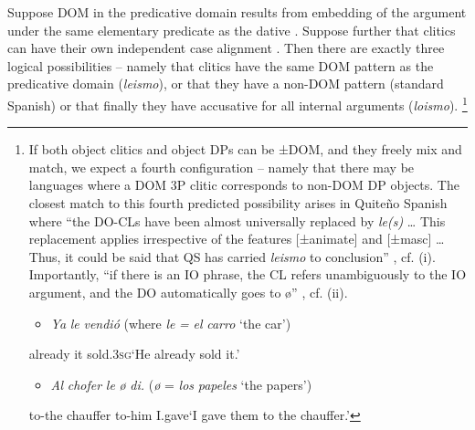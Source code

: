 \documentclass[output=paper,nonflat,modfonts]{langsci/langscibook}
\begin{document}
Suppose DOM in the predicative domain results from embedding of the argument under the same elementary predicate as the dative . Suppose further that clitics can have their own independent case alignment . Then there are exactly three logical possibilities – namely that clitics have the same DOM pattern as the predicative domain (\textit{leismo}), or that they have a non-DOM pattern (standard Spanish) or that finally they have accusative for all internal arguments (\textit{loismo}).\textstyleFootnoteSymbol{} \footnote{If both object clitics and object DPs can be ±DOM, and they freely mix and match, we expect a fourth configuration – namely that there may be languages where a DOM 3P clitic corresponds to non-DOM DP objects. The closest match to this fourth predicted possibility arises in Quiteño Spanish where “the DO-CLs have been almost universally replaced by \textit{le(s)} … This replacement applies irrespective of the features [±animate] and [±masc] …Thus, it could be said that QS has carried \textit{leismo} to conclusion” \citep[387-388]{Suñer1989}, cf. (i). Importantly, “if there is an IO phrase, the CL refers unambiguously to the IO argument, and the DO automatically goes to ø” \citep[389]{Suñer1989}, cf. (ii).  

\begin{itemize}
\item \begin{styleListParagraph}
\textit{Ya} \textit{le}   \textit{vendió}      (where \textit{le} \textit{=} \textit{el} \textit{carro} ‘the car’)
\end{styleListParagraph}
\end{itemize}
already   it   sold\textsc{.3sg}‘He already sold it.’\begin{itemize}
\item \begin{styleListParagraph}
\textit{Al} \textit{chofer}     \textit{le}   \textit{ø} \textit{di.}   (\textit{ø} = \textit{los} \textit{papeles} ‘the papers’)
\end{styleListParagraph}
\end{itemize}
to-the chauffer   to-him   I.gave‘I gave them to the chauffer.’}
\end{document}
